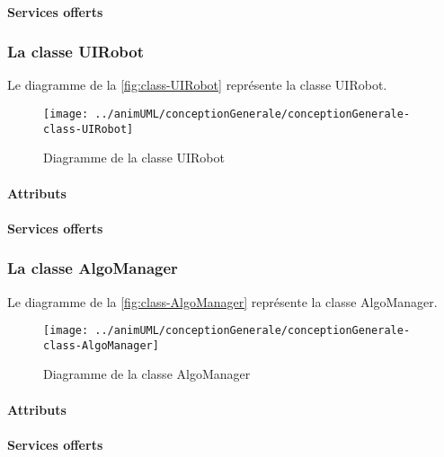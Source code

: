\paragraph{Services offerts}
\classArchivistOperations
\subsubsection{La classe UIRobot}

Le diagramme de la \autoref{fig:class-UIRobot} représente la classe UIRobot.
\begin{figure}[H]
	\centering
	\texttt{[image: ../animUML/conceptionGenerale/conceptionGenerale-class-UIRobot]}
	\caption{Diagramme de la classe UIRobot}
	\label{fig:class-UIRobot}
\end{figure}


\paragraph{Attributs}
\classUIRobotProperties
\paragraph{Services offerts}
\classUIRobotOperations
\subsubsection{La classe AlgoManager}

Le diagramme de la \autoref{fig:class-AlgoManager} représente la classe AlgoManager.
\begin{figure}[H]
	\centering
	\texttt{[image: ../animUML/conceptionGenerale/conceptionGenerale-class-AlgoManager]}
	\caption{Diagramme de la classe AlgoManager}
	\label{fig:class-AlgoManager}
\end{figure}


\paragraph{Attributs}
\classAlgoManagerProperties
\paragraph{Services offerts}
\classAlgoManagerOperations
